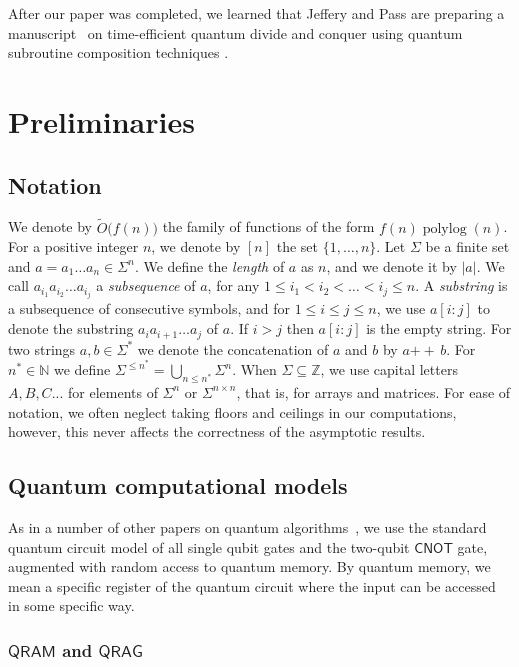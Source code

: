 \documentclass[12pt]{article}
\newcommand{\N}{\mathbb{N}}
\newcommand{\Z}{\mathbb{Z}}
\newcommand{\concat}{\ensuremath{+\!\!\!\!+\,}}
\newcommand{\upto}{\mathbin{:}}
\DeclareMathOperator{\polylog}{polylog}
\theoremstyle{definition}
\begin{document}
After our paper was completed, we learned that Jeffery and Pass are preparing a manuscript~\cite{JP23} on time-efficient quantum divide and conquer using quantum subroutine composition techniques \cite{Jeff22}.

\section{Preliminaries}
\label{sec:prelim}
\subsection{Notation}
We denote by $\widetilde{O}({f(n))}$ the family of functions of the form $f(n) \polylog(n)$.
For a positive integer $n$, we denote by $[n]$ the set $\{1, \ldots , n \}$.
Let $\Sigma$ be a finite set and $a = a_1 \ldots a_{n} \in \Sigma^n$. 
We define the {\em length} of $a$ as $n$, and we denote it by $|a|$.
We call $a_{i_1} a_{i_2} \ldots a_{i_j}$ a {\em subsequence} of $a$, for any $1 \leq i_1 < i_2 < \ldots < i_j \leq n$. A {\em substring} is a subsequence of consecutive symbols, and for $1 \leq i \le j \leq n$, we use $a[i\upto j]$ to denote the substring $a_i a_{i+1} \ldots a_j$ of $a$.  If 
$i > j$ then $a[i \upto j]$ is the empty string. 
For two strings $a,b \in \Sigma^*$ we denote the concatenation of $a$ and $b$ by $a \concat b$.
For $n^* \in \N$ we define $\Sigma^{\leq n^*} = \bigcup_{n \leq n^*} \Sigma^n$.
When $\Sigma \subseteq \Z$, we use capital letters $A,B,C...$ for elements of $\Sigma^n$ or $\Sigma^{n \times n}$, that is, for arrays and matrices.
For ease of notation, we often neglect taking floors and ceilings in our computations, however, this never affects the correctness of the asymptotic results.

\subsection{Quantum computational models}
\label{subsec:memory}
As in a number of other papers on quantum algorithms~\cite{Amb07, BJLM13, ABIKPV19, AHJKS22}, we use the standard quantum circuit model of all single qubit gates and the two-qubit $\mathsf{CNOT}$ gate, augmented with random access to quantum memory. By quantum memory, we mean a specific register of the quantum circuit
where the input can be accessed in some specific way. 

\subsubsection{$\mathsf{QRAM}$ and $\mathsf{QRAG}$}
\end{document}
